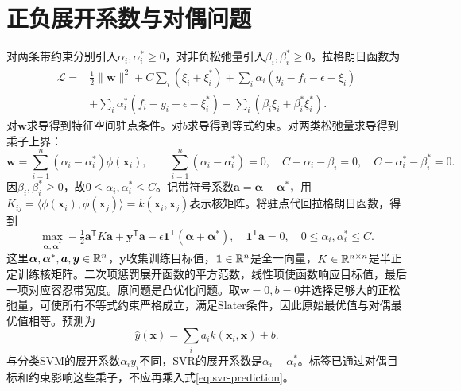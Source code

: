 \section{正负展开系数与对偶问题}
对两条带约束分别引入$\alpha_i,\alpha_i^*\ge0$，对非负松弛量引入$\beta_i,\beta_i^*\ge0$。拉格朗日函数为
\begin{align}
 \mathcal L={}&\tfrac12\|\bm w\|^2+C\sum_i(\xi_i+\xi_i^*)
 +\sum_i\alpha_i(y_i-f_i-\epsilon-\xi_i)\nonumber\\
 &+\sum_i\alpha_i^*(f_i-y_i-\epsilon-\xi_i^*)
 -\sum_i(\beta_i\xi_i+\beta_i^*\xi_i^*).
\end{align}
对$\bm w$求导得到特征空间驻点条件。对$b$求导得到等式约束。对两类松弛量求导得到乘子上界：
\begin{equation}
 \bm w=\sum_{i=1}^n(\alpha_i-\alpha_i^*)\phi(\bm x_i),\qquad
 \sum_{i=1}^n(\alpha_i-\alpha_i^*)=0,
 \quad C-\alpha_i-\beta_i=0,\quad C-\alpha_i^*-\beta_i^*=0.
\end{equation}
因$\beta_i,\beta_i^*\ge0$，故$0\le\alpha_i,\alpha_i^*\le C$。记带符号系数$\bm a=\bm\alpha-\bm\alpha^*$，用$K_{ij}=\langle\phi(\bm x_i),\phi(\bm x_j)\rangle=k(\bm x_i,\bm x_j)$表示核矩阵。将驻点代回拉格朗日函数，得到
\begin{equation}
 \max_{\bm\alpha,\bm\alpha^*}
 -\tfrac12\bm a^{\mathsf T}K\bm a+\bm y^{\mathsf T}\bm a
 -\epsilon\bm1^{\mathsf T}(\bm\alpha+\bm\alpha^*),
 \quad\bm1^{\mathsf T}\bm a=0,
 \quad0\le\alpha_i,\alpha_i^*\le C.
 \label{eq:svr-dual}
\end{equation}
这里$\bm\alpha,\bm\alpha^*,\bm a,\bm y\in\mathbb{R}^n$，$\bm y$收集训练目标值，$\bm1\in\mathbb{R}^n$是全一向量，$K\in\mathbb{R}^{n\times n}$是半正定训练核矩阵。二次项惩罚展开函数的平方范数，线性项使函数响应目标值，最后一项对应容忍带宽度。原问题是凸优化问题。取$\bm w=0,b=0$并选择足够大的正松弛量，可使所有不等式约束严格成立，满足Slater条件，因此原始最优值与对偶最优值相等。预测为
\begin{equation}
 \hat y(\bm x)=\sum_i a_i k(\bm x_i,\bm x)+b.
 \label{eq:svr-prediction}
\end{equation}
与分类SVM的展开系数$\alpha_i y_i$不同，SVR的展开系数是$\alpha_i-\alpha_i^*$。标签已通过对偶目标和约束影响这些乘子，不应再乘入式\eqref{eq:svr-prediction}。

